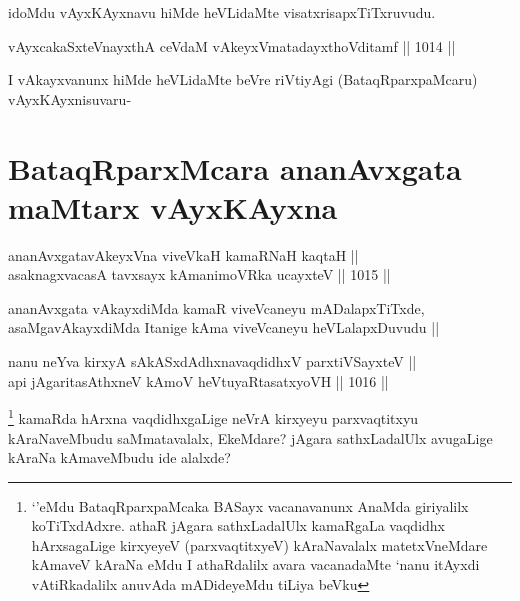 \begin{artha}
idoMdu vAyxKAyxnavu hiMde heVLidaMte visatxrisapxTiTxruvudu.
\end{artha}


\begin{shl}
vAyxcakaSxteV\s nayxthA ceVdaM vAkeyxVmatadayxthoVditamf ||  1014 ||  \\
\end{shl}

\begin{artha}
I vAkayxvanunx hiMde heVLidaMte beVre riVtiyAgi (BataqRparxpaMcaru) vAyxKAyxnisuvaru-
\end{artha}

\section*{BataqRparxMcara ananAvxgata maMtarx vAyxKAyxna}


\begin{shl}
ananAvxgatavAkeyxVna viveVkaH kamaRNaH kaqtaH || \\
asaknagxvacasA tavxsayx kAmanimoVRka ucayxteV ||  1015 ||
\end{shl}

\begin{artha}
ananAvxgata vAkayxdiMda kamaR viveVcaneyu mADalapxTiTxde, asaMgavAkayxdiMda Itanige kAma viveVcaneyu heVLalapxDuvudu ||
\end{artha}


\begin{shl}
nanu neYva kirxyA sAkASxdAdhxnavaqdidhxV parxtiVSayxteV ||\\  
api jAgaritasAthxneV kAmoV heVtuyaRtasatxyoVH ||  1016 ||
\end{shl}

\begin{artha}
\footnote{`\stext'eMdu BataqRparxpaMcaka BASayx vacanavanunx AnaMda giriyalilx koTiTxdAdxre. athaR jAgara sathxLadalUlx kamaRgaLa vaqdidhx hArxsagaLige kirxyeyeV (parxvaqtitxyeV) kAraNavalalx matetxVneMdare kAmaveV kAraNa eMdu I athaRdalilx avara vacanadaMte `nanu itAyxdi vAtiRkadalilx anuvAda mADideyeMdu tiLiya beVku}
kamaRda hArxna vaqdidhxgaLige neVrA kirxyeyu parxvaqtitxyu kAraNaveMbudu saMmatavalalx, EkeMdare? jAgara sathxLadalUlx avugaLige kAraNa kAmaveMbudu ide alalxde?
\end{artha}

